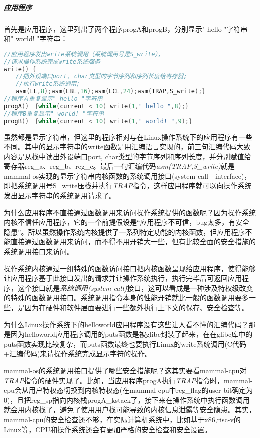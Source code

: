 \subparagraph{应用程序}
首先是应用程序，这里列出了两个程序progA和progB，分别显示" hello "字符串和" world! "字符串：
\begin{lstlisting}[language={C}]
//应用程序发出write系统调用（系统调用号是S_write），
//请求操作系统完成write系统服务
write() { 
　　//把外设端口port, char类型的字节序列和序列长度给寄存器; 
　　//执行write系统调用; 
　　asm(LL,8);asm(LBL,16);asm(LCL,24);asm(TRAP,S_write);}
//程序Ａ重复显示" hello "字符串
progA()　{while(current < 10) write(1," hello ",8);}
//程序B重复显示" world! "字符串
progB()　{while(current < 10) write(1," world! ",9);}
\end{lstlisting}

虽然都是显示字符串，但这里的程序相对与在Linux操作系统下的应用程序有一些不同。其中的显示字符串的write函数是用汇编语言实现的，前三句汇编代码大致内容是从栈中读出外设端口port, char类型的字节序列和序列长度，并分别赋值给寄存器reg\_a、reg\_b、reg\_c。最后一句汇编代码\textit{asm(TRAP,S\_write)}就是mammal-os实现的显示字符串内核函数的系统调用接口(system call　interface)，即把系统调用号S\_write压栈并执行\textit{TRAP}指令，这样应用程序就可以向操作系统发出显示字符串的系统调用请求了。

为什么应用程序不直接通过函数调用来访问操作系统提供的函数呢？因为操作系统内核不信任应用程序，它的一个前提假设是“应用程序不可信，bug太多，有安全隐患”。所以虽然操作系统内核提供了一系列特定功能的内核函数，但应用程序不能直接通过函数调用来访问，而不得不用开销大一些，但有比较全面的安全措施的系统调用接口来访问。

\begin{note} 
操作系统内核通过一组特殊的函数访问接口把内核函数呈现给应用程序，使得能够让应用程序基于此接口发出的请求并让操作系统执行，执行完毕后可返回应用程序，这个接口就是\emph{系统调用(system call)}接口\label{syscall}，这可以看成是一种涉及特权级改变的特殊的函数调用接口。系统调用指令本身的性能开销就比一般的函数调用要多一些，是因为在硬件和软件层面要进行一些额外执行上下文的保存、安全检查等。
\end{note} 

为什么Linux操作系统下的helloworld应用程序没有这些让人看不懂的汇编代码？那是因为helloworld应用程序调用的puts函数是被glibc封装了起来，在在glibc库中的puts函数实现比较复杂，而puts函数最终也要执行Linux的write系统调用(C代码+汇编代码)来请操作系统完成显示字符的操作。



mammal-os的系统调用接口提供了哪些安全措施呢？这其实要看mammal-cpu对\textit{TRAP}指令的硬件实现了。比如，当应用程序progA执行\textit{TRAP}指令时，mammal-cpu会从用户特权态切换到内核特权态(在mammal-cpu中reg\_flag的user bit确定为0)，且把reg\_sp指向内核栈progA\_kstack了，接下来在操作系统中执行函数调用就会用内核栈了，避免了使用用户栈可能导致的内核信息泄露等安全隐患。其实，mammal-cpu的安全检查还不够，在实际计算机系统中，比如基于x86,risc-v的Linux等，CPU和操作系统还会有更加严格的安全检查和安全设置。

